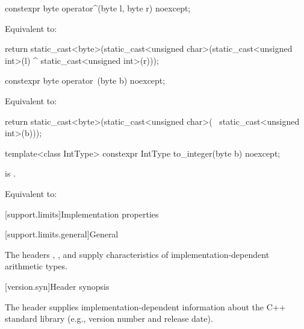 %
\begin{itemdecl}
constexpr byte operator^(byte l, byte r) noexcept;
\end{itemdecl}

\begin{itemdescr}
\pnum
\effects
Equivalent to:
\begin{codeblock}
return static_cast<byte>(static_cast<unsigned char>(static_cast<unsigned int>(l) ^
                                                    static_cast<unsigned int>(r)));
\end{codeblock}
\end{itemdescr}

%
\begin{itemdecl}
constexpr byte operator~(byte b) noexcept;
\end{itemdecl}

\begin{itemdescr}
\pnum
\effects
Equivalent to:
\begin{codeblock}
return static_cast<byte>(static_cast<unsigned char>(
	                   ~static_cast<unsigned int>(b)));
\end{codeblock}
\end{itemdescr}

%
\begin{itemdecl}
template<class IntType>
  constexpr IntType to_integer(byte b) noexcept;
\end{itemdecl}

\begin{itemdescr}
\pnum
\constraints
{} is .

\pnum
\effects
Equivalent to: 
\end{itemdescr}

[support.limits]{Implementation properties}

[support.limits.general]{General}

\pnum
The headers
,
, and
supply characteristics of
%
imple\-mentation-dependent
arithmetic types.

[version.syn]{Header  synopsis}

\pnum
The header 
supplies implementation-dependent information
about the C++ standard library
(e.g., version number and release date).

